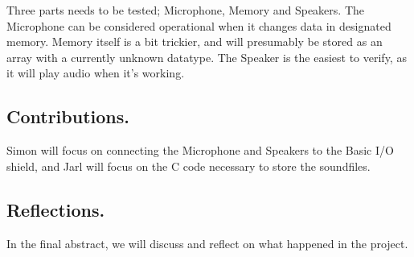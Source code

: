 \documentclass[a4paper,11pt,twoside]{article}
\begin{document}
Three parts needs to be tested; Microphone, Memory and Speakers.
The Microphone can be considered operational when it changes data in designated memory.
Memory itself is a bit trickier, and will presumably be stored as an array with a currently unknown datatype.
The Speaker is the easiest to verify, as it will play audio when it's working.

\subsection*{Contributions.}

Simon will focus on connecting the Microphone and Speakers to the Basic I/O shield, and Jarl will focus on the C code necessary to store the soundfiles.

\subsection*{Reflections.}

In the final abstract, we will discuss and reflect on what happened in the project.
\end{document}
